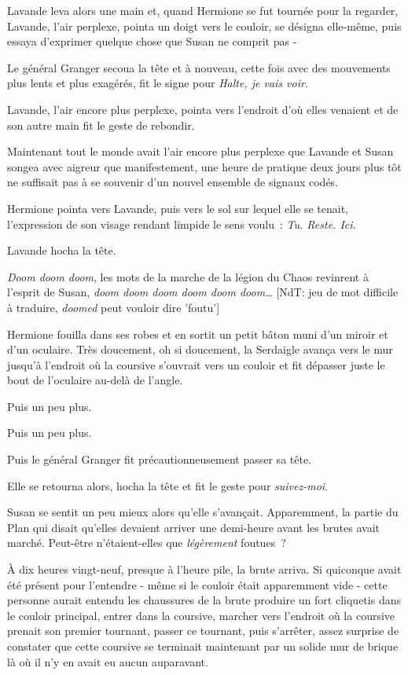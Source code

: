 Lavande leva alors une main et, quand Hermione se fut tournée pour la regarder, Lavande, l'air perplexe, pointa un doigt vers le couloir, se désigna elle-même, puis essaya d'exprimer quelque chose que Susan ne comprit pas -

Le général Granger secoua la tête et à nouveau, cette fois avec des mouvements plus lents et plus exagérés, fit le signe pour \emph{Halte, je vais voir}.

Lavande, l'air encore plus perplexe, pointa vers l'endroit d'où elles venaient et de son autre main fit le geste de rebondir.

Maintenant tout le monde avait l'air encore plus perplexe que Lavande et Susan songea avec aigreur que manifestement, une heure de pratique deux jours plus tôt ne suffisait pas à se souvenir d'un nouvel ensemble de signaux codés.

Hermione pointa vers Lavande, puis vers le sol sur lequel elle se tenait, l'expression de son visage rendant limpide le sens voulu~: \emph{Tu. Reste. Ici.}

Lavande hocha la tête.

\emph{Doom doom doom}, les mots de la marche de la légion du Chaos revinrent à l'esprit de Susan, \emph{doom doom doom doom doom doom…} {[}NdT: jeu de mot difficile à traduire, \emph{doomed} peut vouloir dire 'foutu'{]}

Hermione fouilla dans ses robes et en sortit un petit bâton muni d'un miroir et d'un oculaire. Très doucement, oh si doucement, la Serdaigle avança vers le mur jusqu'à l'endroit où la coursive s'ouvrait vers un couloir et fit dépasser juste le bout de l'oculaire au-delà de l'angle.

Puis un peu plus.

Puis un peu plus.

Puis le général Granger fit précautionneusement passer sa tête.

Elle se retourna alors, hocha la tête et fit le geste pour \emph{suivez-moi}.

Susan se sentit un peu mieux alors qu'elle s'avançait. Apparemment, la partie du Plan qui disait qu'elles devaient arriver une demi-heure avant les brutes avait marché. Peut-être n'étaient-elles que \emph{légèrement} foutues~?

\later

À dix heures vingt-neuf, presque à l'heure pile, la brute arriva. Si quiconque avait été présent pour l'entendre - même si le couloir était apparemment vide - cette personne aurait entendu les chaussures de la brute produire un fort cliquetis dans le couloir principal, entrer dans la coursive, marcher vers l'endroit où la coursive prenait son premier tournant, passer ce tournant, puis s'arrêter, assez surprise de constater que cette coursive se terminait maintenant par un solide mur de brique là où il n'y en avait eu aucun auparavant.


